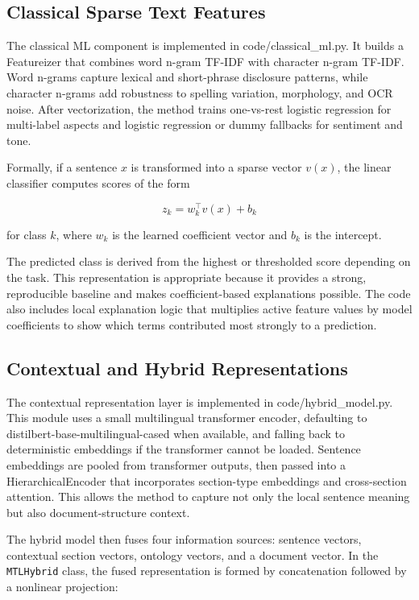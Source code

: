 \subsection{Classical Sparse Text Features}

The classical ML component is implemented in code/classical\_ml.py. It builds a Featureizer that combines word n-gram TF-IDF with character n-gram TF-IDF. Word n-grams capture lexical and short-phrase disclosure patterns, while character n-grams add robustness to spelling variation, morphology, and OCR noise. After vectorization, the method trains one-vs-rest logistic regression for multi-label aspects and logistic regression or dummy fallbacks for sentiment and tone.

Formally, if a sentence \(x\) is transformed into a sparse vector \(v(x)\),
the linear classifier computes scores of the form

\[
z_k = w_k^\top v(x) + b_k
\]

for class \(k\), where \(w_k\) is the learned coefficient vector and \(b_k\)
is the intercept. 

The predicted class is derived from the highest or thresholded score depending on the task. This representation is appropriate because it provides a strong, reproducible baseline and makes coefficient-based explanations possible. The code also includes local explanation logic that multiplies active feature values by model coefficients to show which terms contributed most strongly to a prediction.

\subsection{Contextual and Hybrid Representations}

The contextual representation layer is implemented in code/hybrid\_model.py. This module uses a small multilingual transformer encoder, defaulting to distilbert-base-multilingual-cased when available, and falling back to deterministic embeddings if the transformer cannot be loaded. Sentence embeddings are pooled from transformer outputs, then passed into a HierarchicalEncoder that incorporates section-type embeddings and cross-section attention. This allows the method to capture not only the local sentence meaning but also document-structure context.

The hybrid model then fuses four information sources: sentence vectors,
contextual section vectors, ontology vectors, and a document vector. In the
\texttt{MTLHybrid} class, the fused representation is formed by concatenation
followed by a nonlinear projection:

